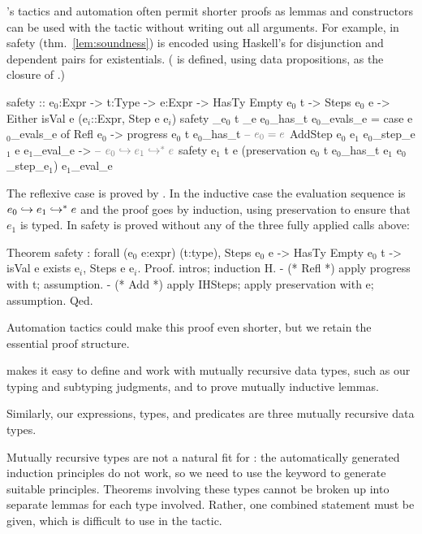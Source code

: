 \coq's tactics and automation often permit shorter
proofs as lemmas and constructors can be used with the
 tactic without writing out all arguments. 
%
For example, in \lh 
safety (thm.~\ref{lem:soundness})
is encoded using 
Haskell's 
for disjunction
and dependent pairs for existentials.
%
( is defined, using data propositions, as the 
closure of .)
%
\begin{mcode}
  safety :: e$_0$:Expr -> t:Type -> e:Expr -> HasTy Empty e$_0$ t 
         -> Steps e$_0$ e -> Either {isVal e}  (e$_i$::Expr, Step e e$_i$)
  safety _e$_0$ t _e e$_0$_has_t e$_0$_evals_e = case e$_0$_evals_e of
     Refl e$_0$ -> progress e$_0$ t e$_0$_has_t       -- $\cmt{e_0 = e}$
     AddStep e$_0$ e$_1$ e$_0$_step_e$_1$ e e$_1$_eval_e ->  -- $\cmt{e_0 \step \evalsTo{e_1}{e}}$
       safety e$_1$ t e (preservation e$_0$ t e$_0$_has_t e$_1$ e$_0$_step_e$_1$) e$_1$_eval_e
\end{mcode}
%
    The reflexive case is proved by .
    In the inductive case the evaluation
    sequence is $e_0 \hookrightarrow {e_1} \hookrightarrow^{*} {e}$
    and the proof goes by induction,
    using preservation to ensure that
    $e_1$ is typed.  
%
In \coq safety is proved 
without any of the three fully applied calls above:
%
\begin{mcode}
  Theorem safety : forall (e$_0$ e:expr) (t:type),
     Steps e$_0$ e -> HasTy Empty e$_0$ t -> isVal e \/ exists e$_i$, Steps e e$_i$.
  Proof. intros; induction H.
    - (* Refl *) apply progress with t; assumption.
    - (* Add  *) apply IHSteps; apply preservation with e; assumption. Qed.
\end{mcode}
%
Automation tactics could make this proof even shorter,
but we retain the essential proof structure.

\lh makes it easy to define and work with mutually
recursive data types, 
such as our typing and subtyping judgments,
and to prove mutually inductive lemmas.
%
\begin{fullversion}
    Similarly, our 
    expressions, types, and predicates are
    three mutually recursive data types.
\end{fullversion}
%
Mutually recursive types are not a natural fit for \coq: 
the automatically generated induction principles do not work,
so we need to use the  keyword to generate  
suitable principles.
%
Theorems involving these types cannot be
broken up into separate lemmas for each type 
involved. 
%
Rather, one combined statement must be given,
which is difficult to use %
in the  tactic.


